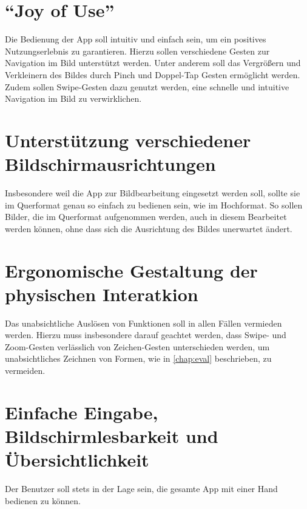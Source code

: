 \section{``Joy of Use''}
Die Bedienung der App soll intuitiv und einfach sein, um ein positives Nutzungserlebnis zu garantieren.
Hierzu sollen verschiedene Gesten zur Navigation im Bild unterstützt werden.
Unter anderem soll das Vergrößern und Verkleinern des Bildes durch Pinch und Doppel-Tap Gesten ermöglicht werden.
Zudem sollen Swipe-Gesten dazu genutzt werden, eine schnelle und intuitive Navigation im Bild zu verwirklichen.

\section{Unterstützung verschiedener Bildschirmausrichtungen}
Insbesondere weil die App zur Bildbearbeitung eingesetzt werden soll, sollte sie im Querformat genau so einfach zu bedienen sein, wie im Hochformat.
So sollen Bilder, die im Querformat aufgenommen werden, auch in diesem Bearbeitet werden können, ohne dass sich die Ausrichtung des Bildes unerwartet ändert.

\section{Ergonomische Gestaltung der physischen Interatkion}
Das unabsichtliche Auslösen von Funktionen soll in allen Fällen vermieden werden.
Hierzu muss insbesondere darauf geachtet werden, dass Swipe- und Zoom-Gesten verlässlich von Zeichen-Gesten unterschieden werden, um unabsichtliches Zeichnen von Formen, wie in \autoref{chap:eval} beschrieben, zu vermeiden.

\section{Einfache Eingabe, Bildschirmlesbarkeit und Übersichtlichkeit}
Der Benutzer soll stets in der Lage sein, die gesamte App mit einer Hand bedienen zu können.



